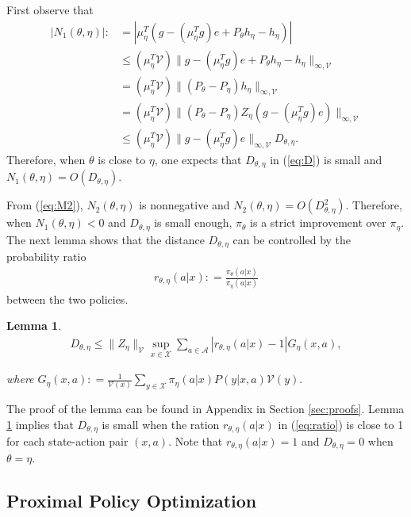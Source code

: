 \documentclass[11pt]{article}
\newcommand{\X}{\mathcal{X}}
\newcommand{\A}{\mathcal{A}}
\newcommand{\V}{\mathcal{V}}
\newtheorem{lemma}{Lemma}
\theoremstyle{definition}
\numberwithin{equation}{section}
\begin{document}
First observe that
\begin{align*}
|N_1(\theta, \eta)|:&= \left|\mu_{\eta}^T( g -(\mu_\eta^Tg) e   +P_{\theta}h_{\eta} - h_{\eta} ) \right|\\
 &\leq (\mu_{\eta}^T\V)\| g - (\mu_\eta^Tg) e  +P_{\theta}h_{\eta} - h_{\eta } \|^{ }_{\infty, \V}\\
& =  (\mu_{\eta}^T\V)\| (P_{\theta} - P_{\eta})h_{\eta} \|^{ }_{\infty, \V}\\
&= (\mu_{\eta}^T\V)\| (P_{\theta} - P_{\eta}) Z_{\eta}\left (g- (\mu_\eta^Tg) e\right)\|^{ }_{\infty, \V}\\
&\leq (\mu_{\eta}^T\V )\| g -(\mu_\eta^Tg) e \|_{\infty, \V}^{ } D_{\theta, \eta}.
\end{align*}
Therefore, when $\theta$ is close to $\eta$, one expects that $D_{\theta, \eta}$
in (\ref{eq:D}) is small and  $N_1(\theta, \eta) =O(D_{\theta, \eta})$.

From (\ref{eq:M2}), $N_2(\theta, \eta)$ is nonnegative and
$N_2(\theta, \eta) = O(D_{\theta, \eta}^2)$.  Therefore, when
$N_1({\theta, \eta})<0$ and $D_{\theta, \eta}$ is small enough,
$\pi_\theta$ is a strict improvement over $\pi_\eta$.  The next lemma shows
that the distance $D_{\theta, \eta}$ can be controlled by the
probability ratio
\begin{align}
  \label{eq:ratio}
 r_{\theta, \eta}(a|x): =\frac{\pi_\theta(a|x)}{ \pi_{\eta}(a|x)}
\end{align}
between the two policies.
\begin{lemma}\label{lem:policies}
   \begin{align*}
D_{\theta, \eta} \leq   \|Z_{\eta}\|^{ }_\V\sup\limits_{x\in \X}    \sum\limits_{a\in \A} \left| r_{\theta, \eta}(a|x)-  1 \right|    G_{\eta}(x, a),
\end{align*}

where $G_{\eta}(x, a): =   \frac{1}{\V(x)} \sum\limits_{y\in \X}  \pi_{\eta}(a|x) P(y|x, a) \V(y)  .$
\end{lemma}


The proof of the lemma can be found in Appendix in Section
\ref{sec:proofs}. Lemma \ref{lem:policies} implies that
$D_{\theta, \eta}$ is small when the ration  $r_{\theta, \eta}(a|x)$  in (\ref{eq:ratio}) is close to 1
for each state-action pair $(x, a)$. Note that
$r_{\theta, \eta}(a|x) = 1$ and $D_{\theta, \eta}=0$ when
$\theta=\eta.$

\subsection{Proximal Policy Optimization}\label{sec:ppo}
\end{document}
